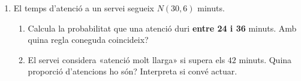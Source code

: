 \begin{enumerate}[label=\textbf{\arabic*.}, leftmargin=2em, itemsep=7pt, start=4]
  \item El temps d'atenció a un servei segueix $N(30,6)$ minuts.
        \begin{enumerate}[label=\alph*), leftmargin=1.6em, topsep=2pt, itemsep=2pt]
          \item Calcula la probabilitat que una atenció duri \textbf{entre 24 i 36}
                minuts. Amb quina regla coneguda coincideix?
          \item El servei considera «atenció molt llarga» si supera els $42$ minuts.
                Quina proporció d'atencions ho són? Interpreta si convé actuar.
        \end{enumerate}
\end{enumerate}


